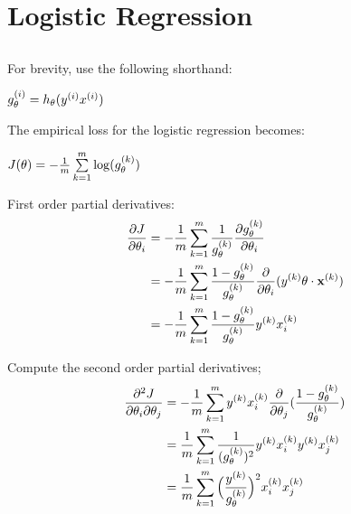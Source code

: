 \documentclass[main]{subfiles}
\begin{document}
\section{Logistic Regression}
\label{sec:logistic_regression}

\subsection{}

For brevity, use the following shorthand:
\begin{center}
\begin{math}
	g_{\mathbf{\theta}}^{(i)} = h_{\mathbf{\theta}}(y^{(i)}x^{(i)})
\end{math}
\end{center}

The empirical loss for the logistic regression becomes:
\begin{center}
\begin{math}
	J(\theta) = -\frac{1}{m} \sum\limits_{k=1}^{m}
				\log(g_{\mathbf{\theta}}^{(k)})
\end{math}
\end{center}

First order partial derivatives:
\begin{align*}
	\frac{\partial J}{\partial \theta_i}
		&=
			-\frac{1}{m} \sum\limits_{k=1}^{m}
			\frac{1}{g_{\mathbf{\theta}}^{(k)}}
			\frac{\partial g_{\mathbf{\theta}}^{(k)}}{\partial \theta_i} \\
		&=
			-\frac{1}{m} \sum\limits_{k=1}^{m}
			\frac{1 - g_{\mathbf{\theta}}^{(k)}}{g_{\mathbf{\theta}}^{(k)}}
			\frac{\partial }{\partial \theta_i} (
				y^{(k)}\mathbf{\theta}\cdot \mathbf{x}^{(k)}
			)									\\
		&=
			-\frac{1}{m} \sum\limits_{k=1}^{m}
			\frac{1 - g_{\mathbf{\theta}}^{(k)}}{g_{\mathbf{\theta}}^{(k)}}
			y^{(k)}x^{(k)}_i
\end{align*}

Compute the second order partial derivatives;
\begin{align*}
	\frac{\partial^2 J}{\partial \theta_i \partial \theta_j}
		&=
			-\frac{1}{m} \sum\limits_{k=1}^{m}
			y^{(k)}x^{(k)}_i
			\frac{\partial }{\partial \theta_j} (
				\frac{1 - g_{\mathbf{\theta}}^{(k)}}{g_{\mathbf{\theta}}^{(k)}}
			)									\\
		&=
			\frac{1}{m} \sum\limits_{k=1}^{m}
			\frac{1}{(g_{\mathbf{\theta}}^{(k)})^2}
			y^{(k)}x^{(k)}_i
			y^{(k)}x^{(k)}_j					\\
		&=
			\frac{1}{m} \sum\limits_{k=1}^{m}
			\Big(\frac{y^{(k)}}{g_{\mathbf{\theta}}^{(k)}}\Big)^2
			 x^{(k)}_i x^{(k)}_j
\end{align*}
\end{document}
